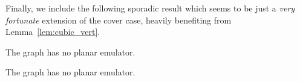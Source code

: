 \documentclass[envcountsect,envcountsame]{llncs}
\renewenvironment{accumulate}{}{}
\begin{document}
\begin{accumulate}
Finally, we include the following sporadic result
which seems to be just a {\em very fortunate} extension of the cover case,
heavily benefiting from Lemma~\ref{lem:cubic_vert}.
\end{accumulate}

\begin{theorem}
\label{thm:K35noemul}
The graph  has no planar emulator.
\end{theorem}
\begin{onlyaccum}
{\def\thetheorem{\ref{thm:K35noemul}}
\begin{theorem}
The graph  has no planar emulator.
\end{theorem}}
\end{onlyaccum}
\end{document}

